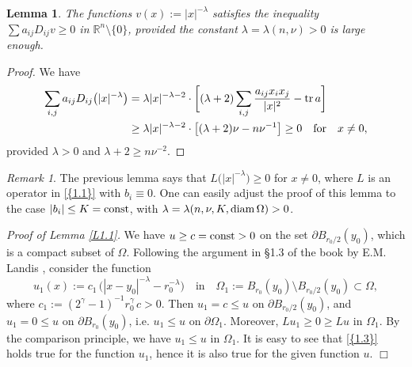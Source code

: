 \documentclass[regno,12pt]{amsart}
\newtheorem{lemma}[theorem]{Lemma}
\theoremstyle{definition}
\theoremstyle{remark}
\newtheorem{remark}[theorem]{Remark}
\begin{document}
\begin{lemma}\label{L1.4}
    The functions $v(x):=|x|^{-\lambda}$ satisfies the inequality\\
     $\sum a_{ij}D_{ij}v\ge 0$ in ${{\mathbb R}^n}{\setminus}\{0\}$, provided the constant $\lambda=\lambda(n,\nu)>0$ is large enough.
\end{lemma}

\begin{proof}
    We have
    \[ \begin{split}
      \sum_{i,j}a_{ij}D_{ij}\big(|x|^{-\lambda}\big) &
      =\lambda |x|^{-\lambda-2}\cdot\bigg[(\lambda+2)\sum_{i,j}\frac{a_{ij}x_ix_j}{|x|^2}
      -{{\rm tr}\,} a \bigg]\\
        & \ge \lambda |x|^{-\lambda-2}\cdot \big[(\lambda+2)\nu- n\nu^{-1}\big]
        \ge 0{\quad\text{{for}}\quad} x\ne 0,
    \end{split} \]
provided $\lambda>0$ and $\lambda+2\ge n\nu^{-2}$.
\end{proof}

\begin{remark}\label{R1.5}
    The previous lemma says that $L\big(|x|^{-\lambda}\big)\ge 0$ for $x\ne 0$, where $L$ is an operator in {\eqref{{1.1}}} with $b_i{\equiv} 0$. One can easily adjust the proof of this lemma to the case $|b_i|\le K={{\rm const}}$, with $\lambda=\lambda(n,\nu,K,{{\rm diam}\,}\Omega)>0$.
\end{remark}

\noindent
\emph{Proof of Lemma \ref{L1.1}.}
    We have $u\ge c={{\rm const}}>0$ on the set ${\partial} B_{r_0/2}(y_0)$, which is a compact subset of $\Omega$.
    Following the argument in \S 1.3 of the book by E.M. Landis \cite{L71}, consider the function
    \[ u_1(x):=c_1\,\big(|x-y_0|^{-\lambda}-r_0^{-\lambda}\big)
    {\quad\text{{in}}\quad} \Omega_1:=B_{r_0}(y_0){\setminus} B_{r_0/2}(y_0)
    {\subset}\Omega, \]
    where $c_1:=(2^{\gamma}-1)^{-1}r_0^{\gamma}\,c>0$.
    Then $u_1=c\le u$ on ${\partial} B_{r_0/2}(y_0)$, and $u_1=0\le u$ on ${\partial} B_{r_0}(y_0)$, i.e. $u_1\le u$ on ${\partial}\Omega_1$. Moreover, $Lu_1\ge 0\ge Lu$ in $\Omega_1$. By the comparison principle, we have $u_1\le u$ in $\Omega_1$. It is easy to see that {\eqref{{1.3}}} holds true for the function $u_1$, hence it is also true for the given function $u$.
\hfill $\Box$
\medskip
\end{document}
